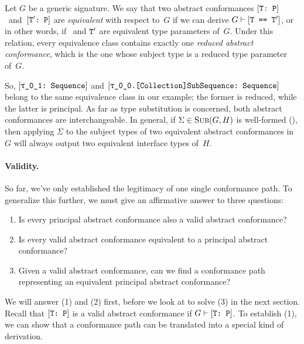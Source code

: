 \documentclass[../generics]{subfiles}
\begin{document}
\begin{definition}
Let $G$ be a generic signature. We say that two abstract conformances $[\texttt{T:~P}]$~and~$[\texttt{$\texttt{T}'$:~P}]$ are \emph{equivalent} with respect to~$G$ if we can derive $G\vdash[\texttt{T == $\texttt{T}'$}]$, or in other words, if \tT\ and $\texttt{T}'$ are equivalent type parameters of~$G$. Under this relation, every equivalence class contains exactly one \emph{reduced abstract conformance}, which is the one whose subject type is a reduced type parameter of~$G$.
\end{definition}

So, $\ConfReq{\rU}{Sequence}$ and $\ConfReq{\rT.[Collection]SubSequence}{Sequence}$ belong to the same equivalence class in our example; the former is reduced, while the latter is principal. As far as type substitution is concerned, both abstract conformances are interchangeable. In general, if $\Sigma\in\textsc{Sub}({G, H})$ is well-formed (), then applying $\Sigma$ to the subject types of two equivalent abstract conformances in~$G$ will always output two equivalent interface types of~$H$.

\paragraph{Validity.} So far, we've only established the legitimacy of one single conformance path. To generalize this further, we must give an affirmative answer to three questions:
\begin{enumerate}
\item Is every principal abstract conformance also a valid abstract conformance?
\item Is every valid abstract conformance equivalent to a principal abstract conformance?
\item Given a valid abstract conformance, can we find a conformance path representing an equivalent principal abstract conformance?
\end{enumerate}
We will answer (1) and (2) first, before we look at  to solve (3) in the next section. Recall that $[\texttt{T:~P}]$ is a valid abstract conformance if $G\vdash[\texttt{T:~P}]$. To establish (1), we can show that a conformance path can be translated into a special kind of derivation.
\end{document}
